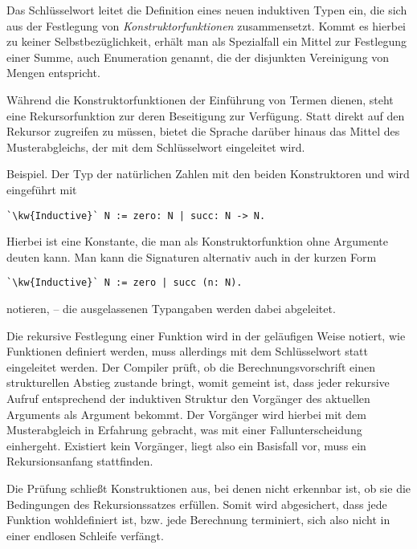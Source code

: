 Das Schlüsselwort  leitet die Definition eines neuen
induktiven Typen ein, die sich aus der Festlegung von
\emph{Konstruktorfunktionen} zusammensetzt. Kommt es hierbei zu keiner
Selbstbezüglichkeit, erhält man als Spezialfall ein Mittel zur Festlegung
einer Summe, auch Enumeration genannt, die der disjunkten Vereinigung
von Mengen entspricht.

Während die Konstruktorfunktionen der Einführung von Termen dienen,
steht eine Rekursorfunktion zur deren Beseitigung zur Verfügung.
Statt direkt auf den Rekursor zugreifen zu müssen, bietet die Sprache
darüber hinaus das Mittel des Musterabgleichs, der mit dem Schlüsselwort
 eingeleitet wird.

Beispiel. Der Typ  der natürlichen Zahlen mit den beiden
Konstruktoren  und  wird eingeführt mit
\begin{lstlisting}[escapechar=`, xleftmargin=\mathindent]
`\kw{Inductive}` N := zero: N | succ: N -> N.
\end{lstlisting}
Hierbei ist  eine Konstante, die man als Konstruktorfunktion
ohne Argumente deuten kann. Man kann die Signaturen alternativ auch in
der kurzen Form
\begin{lstlisting}[escapechar=`, xleftmargin=\mathindent]
`\kw{Inductive}` N := zero | succ (n: N).
\end{lstlisting}
notieren, -- die ausgelassenen Typangaben werden dabei abgeleitet.

Die rekursive Festlegung einer Funktion wird in der geläufigen Weise
notiert, wie Funktionen definiert werden, muss allerdings mit dem
Schlüsselwort  statt  eingeleitet
werden. Der Compiler prüft, ob die Berechnungsvorschrift
einen strukturellen Abstieg zustande bringt, womit gemeint ist, dass
jeder rekursive Aufruf entsprechend der induktiven Struktur den Vorgänger
des aktuellen Arguments als Argument bekommt. Der Vorgänger wird hierbei
mit dem Musterabgleich in Erfahrung gebracht, was mit einer
Fallunterscheidung einhergeht. Existiert kein Vorgänger, liegt also ein
Basisfall vor, muss ein Rekursionsanfang stattfinden.

Die Prüfung schließt Konstruktionen aus, bei denen nicht erkennbar ist,
ob sie die Bedingungen des Rekursionssatzes erfüllen. Somit wird
abgesichert, dass jede Funktion wohldefiniert ist, bzw. jede Berechnung
terminiert, sich also nicht in einer endlosen Schleife verfängt.

